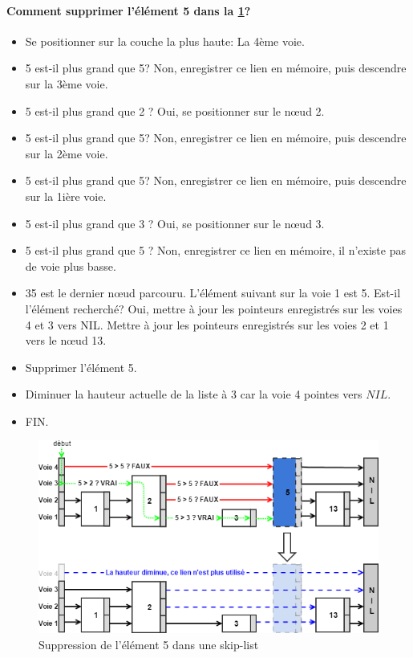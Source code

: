 \documentclass[hidelinks,a4paper, 12pt]{article}
\begin{document}
	\paragraph*{Comment supprimer l'élément 5 dans la \cref{SkipDelete}?}
	\begin{itemize}
		\item Se positionner sur la couche la plus haute: La 4ème voie.
		\item 5 est-il plus grand que 5? Non, enregistrer ce lien en mémoire, puis descendre sur la 3ème voie.
		\item 5 est-il plus grand que 2 ? Oui, se positionner sur le nœud 2.
		\item 5 est-il plus grand que 5? Non, enregistrer ce lien en mémoire, puis descendre sur la 2ème voie.
		\item 5 est-il plus grand que 5? Non, enregistrer ce lien en mémoire, puis descendre sur la 1ière voie.
		\item 5 est-il plus grand que 3 ? Oui, se positionner sur le nœud 3.
		\item 5 est-il plus grand que 5 ? Non, enregistrer ce lien en mémoire, il n'existe pas de voie plus basse.
		\item35 est le dernier nœud parcouru. L'élément suivant sur la voie 1 est 5. Est-il l'élément recherché? Oui, mettre à jour les pointeurs enregistrés sur les voies 4 et 3 vers NIL. Mettre à jour les pointeurs enregistrés sur les voies 2 et 1 vers le nœud 13.
		\item Supprimer l'élément 5.
		\item Diminuer la hauteur actuelle de la liste à 3 car la voie 4 pointes vers $NIL$.
		\item FIN.
	\end{itemize}
	\begin{figure}[h]
		\includegraphics[width=\textwidth]{img/delete}
		\caption{Suppression de l'élément 5 dans une skip-list}
		\label{SkipDelete}
	\end{figure}
	
\end{document}
